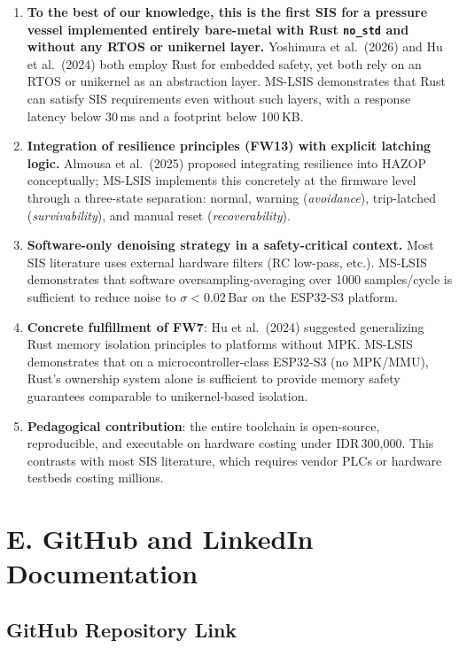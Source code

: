 \documentclass[11pt,a4paper]{article}
\begin{document}
\begin{enumerate}[leftmargin=1.4em,itemsep=4pt]
\item \textbf{To the best of our knowledge, this is the first SIS for a pressure vessel implemented entirely bare-metal with Rust \texttt{no\_std} and without any RTOS or unikernel layer.} Yoshimura et al.\ (2026) and Hu et al.\ (2024) both employ Rust for embedded safety, yet both rely on an RTOS or unikernel as an abstraction layer. MS-LSIS demonstrates that Rust can satisfy SIS requirements even without such layers, with a response latency below 30\,ms and a footprint below 100\,KB.

\item \textbf{Integration of resilience principles (FW13) with explicit latching logic.} Almousa et al.\ (2025) proposed integrating resilience into HAZOP conceptually; MS-LSIS implements this concretely at the firmware level through a three-state separation: normal, warning (\textit{avoidance}), trip-latched (\textit{survivability}), and manual reset (\textit{recoverability}).

\item \textbf{Software-only denoising strategy in a safety-critical context.} Most SIS literature uses external hardware filters (RC low-pass, etc.). MS-LSIS demonstrates that software oversampling-averaging over 1000 samples/cycle is sufficient to reduce noise to $\sigma < 0.02$\,Bar on the ESP32-S3 platform.

\item \textbf{Concrete fulfillment of FW7}: Hu et al.\ (2024) suggested generalizing Rust memory isolation principles to platforms without MPK. MS-LSIS demonstrates that on a microcontroller-class ESP32-S3 (no MPK/MMU), Rust's ownership system alone is sufficient to provide memory safety guarantees comparable to unikernel-based isolation.

\item \textbf{Pedagogical contribution}: the entire toolchain is open-source, reproducible, and executable on hardware costing under IDR\,300,000. This contrasts with most SIS literature, which requires vendor PLCs or hardware testbeds costing millions.
\end{enumerate}

\section{E. GitHub and LinkedIn Documentation}

\subsection*{GitHub Repository Link}
\end{document}

